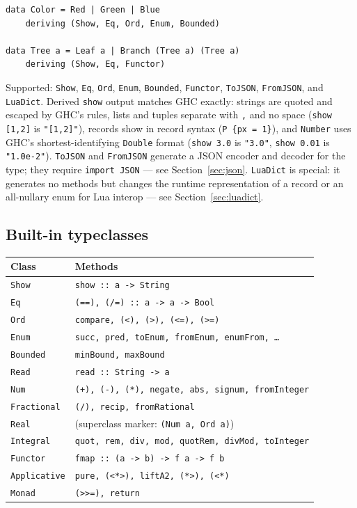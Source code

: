 \documentclass[11pt,a4paper]{article}
\begin{document}
\begin{lstlisting}
data Color = Red | Green | Blue
    deriving (Show, Eq, Ord, Enum, Bounded)

data Tree a = Leaf a | Branch (Tree a) (Tree a)
    deriving (Show, Eq, Functor)
\end{lstlisting}

Supported: \texttt{Show}, \texttt{Eq}, \texttt{Ord}, \texttt{Enum},
\texttt{Bounded}, \texttt{Functor}, \texttt{ToJSON}, \texttt{FromJSON},
and \texttt{LuaDict}.
Derived \texttt{show} output matches GHC exactly: strings are quoted
and escaped by GHC's rules, lists and tuples separate with \texttt{,}
and no space (\texttt{show [1,2]} is \texttt{"[1,2]"}), records show
in record syntax (\texttt{P \{px = 1\}}), and \texttt{Number} uses
GHC's shortest-identifying \texttt{Double} format (\texttt{show 3.0}
is \texttt{"3.0"}, \texttt{show 0.01} is \texttt{"1.0e-2"}).
\texttt{ToJSON} and \texttt{FromJSON} generate a JSON encoder and
decoder for the type; they require \texttt{import JSON} --- see
Section~\ref{sec:json}.
\texttt{LuaDict} is special: it generates no methods but changes the
runtime representation of a record or an all-nullary enum for Lua
interop --- see Section~\ref{sec:luadict}.

\subsection{Built-in typeclasses}

\begin{tabular}{@{}ll@{}}
\toprule
\textbf{Class} & \textbf{Methods} \\
\midrule
\texttt{Show}        & \texttt{show :: a -> String} \\
\texttt{Eq}          & \texttt{(==), (/=) :: a -> a -> Bool} \\
\texttt{Ord}         & \texttt{compare, (<), (>), (<=), (>=)} \\
\texttt{Enum}        & \texttt{succ, pred, toEnum, fromEnum, enumFrom, \ldots} \\
\texttt{Bounded}     & \texttt{minBound, maxBound} \\
\texttt{Read}        & \texttt{read :: String -> a} \\
\texttt{Num}         & \texttt{(+), (-), (*), negate, abs, signum, fromInteger} \\
\texttt{Fractional}  & \texttt{(/), recip, fromRational} \\
\texttt{Real}        & (superclass marker: \texttt{(Num a, Ord a)}) \\
\texttt{Integral}    & \texttt{quot, rem, div, mod, quotRem, divMod, toInteger} \\
\texttt{Functor}     & \texttt{fmap :: (a -> b) -> f a -> f b} \\
\texttt{Applicative} & \texttt{pure, (<*>), liftA2, (*>), (<*)} \\
\texttt{Monad}       & \texttt{(>>=), return} \\
\bottomrule
\end{tabular}
\end{document}
